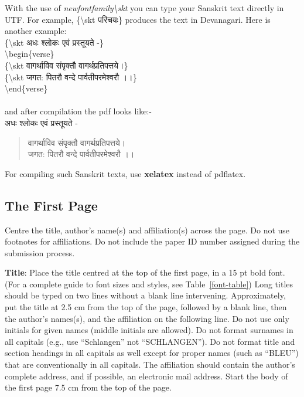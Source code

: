 \documentclass[11pt]{article}
\begin{document}
	With the use of {\it newfontfamily\textbackslash skt} you can type your Sanskrit text directly in UTF.
	For example, \{\textbackslash skt {\skt परिचयः}\} produces the text in Devanagari. Here is another example:\\
	\{\textbackslash skt {\skt अधः श्लोकः एवं प्रस्तूयते -}\}\\
	\textbackslash begin\{verse\}\\
	\{\textbackslash skt {\skt वागर्थाविव संपृक्तौ वागर्थप्रतिपत्तये।}\}\\
	\{\textbackslash skt {\skt जगत: पितरौ वन्दे पार्वतीपरमेश्वरौ ।।}\}\\
	\textbackslash end\{verse\}\\\\
	and after compilation the pdf looks like:- \\
	{\skt अधः श्लोकः एवं प्रस्तूयते -}
	\begin{verse}
		{\skt वागर्थाविव संपृक्तौ वागर्थप्रतिपत्तये।}\\
		{\skt जगत: पितरौ वन्दे पार्वतीपरमेश्वरौ ।।}
	\end{verse}
	For compiling such Sanskrit texts, use {\bf xelatex} instead of pdflatex.
	
	\subsection{The First Page}
	\label{ssec:first}
	
	Centre the title, author's name(s) and affiliation(s) across
	the page.
	Do not use footnotes for affiliations. Do not include the
	paper ID number assigned during the submission process.
	
	{\bf Title}: Place the title centred at the top of the first page, in
	a 15 pt bold font. (For a complete guide to font sizes and styles,
	see Table~\ref{font-table}) Long titles should be typed on two lines
	without a blank line intervening. Approximately, put the title at 2.5
	cm from the top of the page, followed by a blank line, then the
	author's names(s), and the affiliation on the following line. Do not
	use only initials for given names (middle initials are allowed). Do
	not format surnames in all capitals (e.g., use ``Schlangen'' not
	``SCHLANGEN'').  Do not format title and section headings in all
	capitals as well except for proper names (such as ``BLEU'') that are
	conventionally in all capitals.  The affiliation should contain the
	author's complete address, and if possible, an electronic mail
	address. Start the body of the first page 7.5 cm from the top of the
	page.
	
\end{document}
